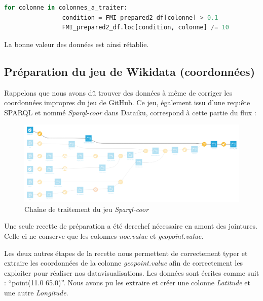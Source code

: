 \documentclass[hidelinks, 12pt]{report}
\begin{document}
\begin{lstlisting}[language=python]
for colonne in colonnes_a_traiter:
				condition = FMI_prepared2_df[colonne] > 0.1
				FMI_prepared2_df.loc[condition, colonne] /= 10
\end{lstlisting}

La bonne valeur des données est ainsi rétablie.





%





\subsection{Préparation du jeu de Wikidata (coordonnées)}

Rappelons que nous avons dû trouver des données à même de corriger les coordonnées impropres du jeu de GitHub. Ce jeu, également issu d'une requête SPARQL et nommé \textit{Sparql-coor} dans Dataiku, correspond à cette partie du flux :

\begin{center}
	\begin{figure}[H]
		\setlength{\belowcaptionskip}{-35pt}
		\includegraphics[scale=0.35]{images/flow-medals-sparql-coor.png}
		\caption{Chaîne de traitement du jeu \textit{Sparql-coor}}
	\end{figure}
\end{center}

Une seule recette de préparation a été derechef nécessaire en amont des jointures. Celle-ci ne conserve que les colonnes \textit{noc.value} et \textit{geopoint.value}.

Les deux autres étapes de la recette nous permettent de correctement typer et extraire les coordonnées de la colonne \textit{geopoint.value} afin de correctement les exploiter pour réaliser nos datavisualisations. \label{casse}Les données sont écrites comme suit : \enquote{point(11.0 65.0)}. Nous avons pu les extraire et créer une colonne \textit{Latitude} et une autre \textit{Longitude}.
\end{document}
